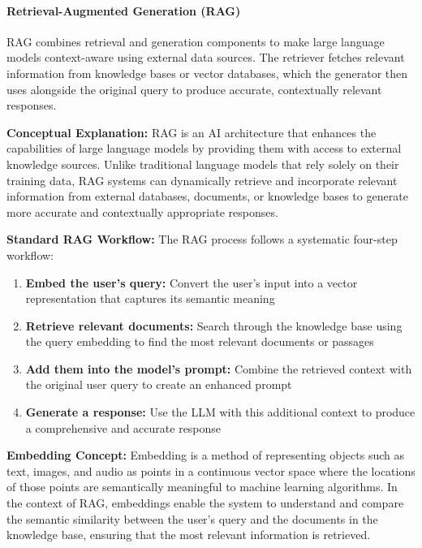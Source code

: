 \paragraph{Retrieval-Augmented Generation (RAG)}
RAG combines retrieval and generation components to make large language models context-aware using external data sources. The retriever fetches relevant information from knowledge bases or vector databases, which the generator then uses alongside the original query to produce accurate, contextually relevant responses.

\textbf{Conceptual Explanation:}
RAG is an AI architecture that enhances the capabilities of large language models by providing them with access to external knowledge sources. Unlike traditional language models that rely solely on their training data, RAG systems can dynamically retrieve and incorporate relevant information from external databases, documents, or knowledge bases to generate more accurate and contextually appropriate responses.

\textbf{Standard RAG Workflow:}
The RAG process follows a systematic four-step workflow:
\begin{enumerate}
    \item \textbf{Embed the user's query:} Convert the user's input into a vector representation that captures its semantic meaning
    \item \textbf{Retrieve relevant documents:} Search through the knowledge base using the query embedding to find the most relevant documents or passages
    \item \textbf{Add them into the model's prompt:} Combine the retrieved context with the original user query to create an enhanced prompt
    \item \textbf{Generate a response:} Use the LLM with this additional context to produce a comprehensive and accurate response
\end{enumerate}

\textbf{Embedding Concept:}
Embedding is a method of representing objects such as text, images, and audio as points in a continuous vector space where the locations of those points are semantically meaningful to machine learning algorithms. In the context of RAG, embeddings enable the system to understand and compare the semantic similarity between the user's query and the documents in the knowledge base, ensuring that the most relevant information is retrieved.

